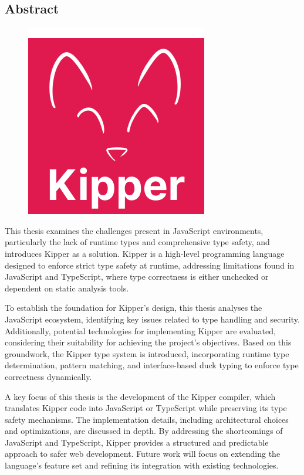 \begin{spacing}{1}
    \chapter*{Abstract}
\end{spacing}
\begin{figure}
    \begin{center}
      \includegraphics[height=0.4\textwidth]{pics/Kipper-Logo.png}
    \end{center}
\end{figure}

This thesis examines the challenges present in JavaScript environments, particularly the lack of runtime types and comprehensive type safety, and introduces Kipper as a solution. Kipper is a high-level programming language designed to enforce strict type safety at runtime, addressing limitations found in JavaScript and TypeScript, where type correctness is either unchecked or dependent on static analysis tools.

To establish the foundation for Kipper's design, this thesis analyses the JavaScript ecosystem, identifying key issues related to type handling and security. Additionally, potential technologies for implementing Kipper are evaluated, considering their suitability for achieving the project's objectives. Based on this groundwork, the Kipper type system is introduced, incorporating runtime type determination, pattern matching, and interface-based duck typing to enforce type correctness dynamically.

A key focus of this thesis is the development of the Kipper compiler, which translates Kipper code into JavaScript or TypeScript while preserving its type safety mechanisms. The implementation details, including architectural choices and optimizations, are discussed in depth. By addressing the shortcomings of JavaScript and TypeScript, Kipper provides a structured and predictable approach to safer web development. Future work will focus on extending the language's feature set and refining its integration with existing technologies.

